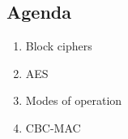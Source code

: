 

\subsection{Agenda}
\begin{enumerate}
\item Block ciphers
\item AES
\item Modes of operation
\item CBC-MAC
\end{enumerate}
